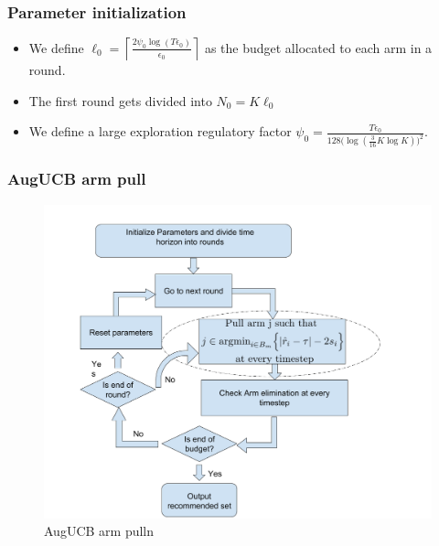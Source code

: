 \begin{frame}
\frametitle{Parameter initialization}
\begin{itemize}
\item<1-> We define $\ell_{0} =\left\lceil \frac{2\psi_0\log( T\epsilon_{0})}{\epsilon_{0}} \right\rceil$ as the budget allocated to each arm in a round.
\item<2-> The first round gets divided into $N_{0}=K\ell_{0}$
\item<3-> We define a large exploration regulatory factor $\psi_{0}=\frac{T\epsilon_{0}}{128\Big(\log(\frac{3}{16}K\log K)\Big)^2}$.
\end{itemize}
\end{frame}

\begin{frame}
\frametitle{AugUCB arm pull}
\begin{figure}
\caption{AugUCB arm pulln}
\includegraphics[scale=0.178]{img/AugUCB_flow_armpull.png}
\end{figure}
\end{frame}

